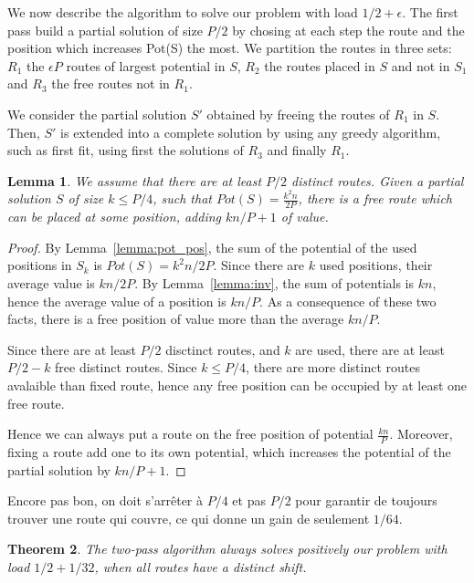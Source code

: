 \documentclass[10pt, conference, letterpaper]{IEEEtran}
\newtheorem{theorem}{Theorem}
\newtheorem{lemma}[theorem]{Lemma}
\begin{document}
We now describe the algorithm to solve our problem with load $1/2 + \epsilon$. The first pass build a partial solution of size $P/2$ by chosing at each step the route and the position which increases Pot(S) the most.
We partition the routes in three sets: $R_1$ the $\epsilon P$ routes of largest potential in $S$, $R_2$ the
routes placed in $S$ and not in $S_1$ and $R_3$ the free routes not in $R_1$. 

We consider the partial solution $S'$ obtained by freeing the routes of $R_1$ in $S$.
Then, $S'$ is extended into a complete solution by using any greedy algorithm, such as first fit, using first the solutions of $R_3$ and finally $R_1$.

\begin{lemma}\label{lemma:improvement}
We assume that there are at least $P/2$ distinct routes.
Given a partial solution $S$ of size $k\leq P/4$, such that 
$Pot(S) = \frac{k^2n}{2P}$, there is a free route which can be placed at some position, adding $kn/P+1$ of value.
\end{lemma}
\begin{proof}

By Lemma~\ref{lemma:pot_pos}, the sum of the potential of the used positions in $S_{k}$ is $Pot(S) = k^2n/2P$. Since there are $k$ used positions, their average value is $kn/2P$.
By Lemma~\ref{lemma:inv}, the sum of potentials is $kn$, hence 
the average value of a position is $kn/P$. As a consequence of these two facts, there is a free position of value more than the average $kn/P$.

Since there are at least $P/2$ disctinct routes, and $k$ are used,
there are at least $P/2 -k$ free distinct routes. Since $k \leq P/4$,
there are more distinct routes avalaible than fixed route, hence any free position can be occupied by at least one free route.
 
Hence we can always put a route on the free position of potential $\frac{kn}{P}$. Moreover, fixing a route add one to its own potential, which increases the potential of the partial solution by $kn/P+1$.
\end{proof}

Encore pas bon, on doit s'arrêter à $P/4$ et pas $P/2$
pour garantir de toujours trouver une route qui couvre, 
ce qui donne un gain de seulement $1/64$.

\begin{theorem}
The two-pass algorithm always solves positively our problem with load $1/2 + 1/32$, when all routes have a distinct shift.
\end{theorem}
\end{document}

